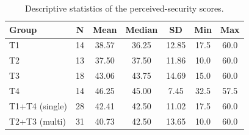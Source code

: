\begin{table}[tbp]
\centering
\begin{tabular}{lcccccc}
\toprule
Group & N & Mean & Median & SD & Min & Max \\ \midrule
T1 & 14 & 38.57 & 36.25 & 12.85 & 17.5 & 60.0 \\
T2 & 13 & 37.50 & 37.50 & 11.86 & 10.0 & 60.0 \\
T3 & 18 & 43.06 & 43.75 & 14.69 & 15.0 & 60.0 \\
T4 & 14 & 46.25 & 45.00 & 7.45 & 32.5 & 57.5 \\
T1+T4 (single) & 28 & 42.41 & 42.50 & 11.02 & 17.5 & 60.0 \\
T2+T3 (multi) & 31 & 40.73 & 42.50 & 13.65 & 10.0 & 60.0 \\
\bottomrule
\end{tabular}
\caption{Descriptive statistics of the perceived-security scores.}
\label{tab:security-stats}
\end{table}

